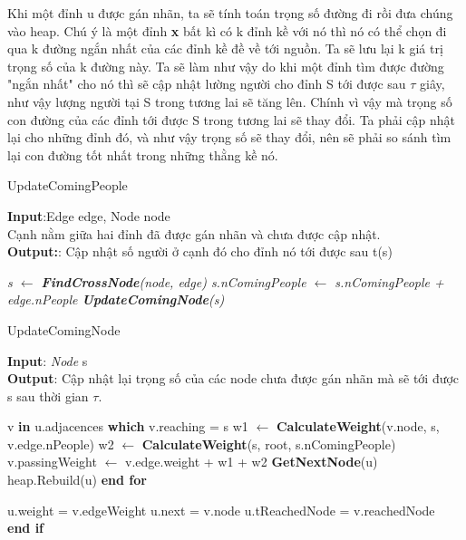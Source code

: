     Khi một đỉnh u được gán nhãn, ta sẽ tính toán trọng số đường đi rồi đưa chúng 
    vào heap. Chú ý là một đỉnh \textbf{x} bất kì có k đỉnh kề với nó thì nó có thể 
    chọn đi qua k đường ngắn nhất của các đỉnh kề đề về tới nguồn. Ta sẽ lưu lại k 
    giá trị trọng số của k đường này. Ta sẽ làm như vậy do khi một đỉnh tìm được đường 
    "ngắn nhất" cho nó thì sẽ cập nhật lường người cho đỉnh S tới được sau $\tau$ giây, 
    như vậy lượng người tại S trong tương lai sẽ tăng lên. Chính vì vậy mà trọng số con 
    đường của các đỉnh tới được S trong tương lai sẽ thay đổi. Ta phải cập nhật lại cho 
    những đỉnh đó, và như vậy trọng số sẽ thay đổi, nên sẽ phải so sánh tìm lại con 
    đường tốt nhất trong những thằng kề nó.

    \begin{algorithm}[H]
        \caption{UpdateComingPeople}
        \textbf{Input}:Edge edge, Node node \\ 
        Cạnh nằm giữa hai đỉnh đã được gán nhãn và chưa được cập nhật. \\
        \textbf{Output:}: Cập nhật số người ở cạnh đó cho đỉnh nó tới được sau t(s)

        \begin{algorithmic}
            \em
            \State s $\gets$ \textbf{FindCrossNode}(node, edge)
            \State s.nComingPeople $\gets$ s.nComingPeople + edge.nPeople
            \State \textbf{UpdateComingNode}(s)
            \EndProcedure
        \end{algorithmic}
    \end{algorithm}

    \begin{algorithm}
        \caption{UpdateComingNode}
        \textbf{Input}: \textit{Node} s \\ 
        \textbf{Output}: Cập nhật lại trọng số của các node chưa được gán nhãn mà sẽ tới
        được s sau thời gian $\tau$.
        \begin{algorithmic}
            \State v \textbf{in} u.adjacences \textbf{which} v.reaching = s
            \State w1 $\gets$ \textbf{CalculateWeight}(v.node, s, v.edge.nPeople)
            \State w2 $\gets$ \textbf{CalculateWeight}(s, root, s.nComingPeople)
            \State v.passingWeight $\gets$ v.edge.weight + w1 + w2
            \State \textbf{GetNextNode}(u)
            \State heap.Rebuild(u)
            \EndFor
            \textbf{end for}
            \EndProcedure

            \State u.weight = v.edgeWeight
            \State u.next = v.node
            \State u.tReachedNode = v.reachedNode \\
            \EndIf
            \textbf{end if}
            \EndFor
            \EndProcedure
        \end{algorithmic}
    \end{algorithm}
    \newpage

